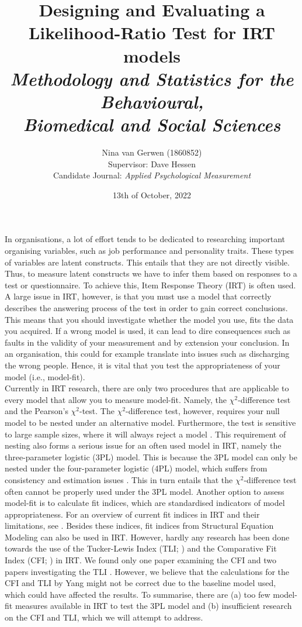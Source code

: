 \documentclass{article}
\title{%
	Designing and Evaluating a Likelihood-Ratio Test for IRT models \\
	\large \textit{Methodology and Statistics for the Behavioural, \\
	Biomedical and Social Sciences}}
\author{Nina van Gerwen (1860852) \\ 
	Supervisor: Dave Hessen \\ 
	\small {Candidate Journal: \textit{Applied Psychological Measurement}}}
\date{13th of October, 2022}
\begin{document}
\maketitle

\newpage

\section{}
\indent In organisations, a lot of effort tends to be dedicated to researching important organising variables, such as job performance and personality traits. These types of variables are latent constructs. This entails that they are not directly visible. Thus, to measure latent constructs we have to infer them based on responses to a test or questionnaire. To achieve this, Item Response Theory (IRT) is often used. A large issue in IRT, however, is that you must use a model that correctly describes the answering process of the test in order to gain correct conclusions. This means that you should investigate whether the model you use, fits the data you acquired. If a wrong model is used, it can lead to dire consequences such as faults in the validity of your measurement \autocite{consq1, consq2, consq3} and by extension your conclusion. In an organisation, this could for example translate into issues such as discharging the wrong people. Hence, it is vital that you test the appropriateness of your model (i.e., model-fit). \\
\indent Currently in IRT research, there are only two procedures that are applicable to every model that allow you to measure model-fit. Namely, the $\chi^2$-difference test and the Pearson's $\chi^2$-test. The $\chi^2$-difference test, however, requires your null model to be nested under an alternative model. Furthermore, the test is sensitive to large sample sizes, where it will always reject a model \autocite{chi2sens}. This requirement of nesting also forms a serious issue for an often used model in IRT, namely the three-parameter logistic (3PL) model. This is because the 3PL model can only be nested under the four-parameter logistic (4PL) model, which suffers from consistency and estimation issues \autocite{4plconsist1, 4plconsist2}. This in turn entails that the $\chi^2$-difference test often cannot be properly used under the 3PL model. Another option to assess model-fit is to calculate fit indices, which are standardised indicators of model appropriateness. For an overview of current fit indices in IRT and their limitations, see \textcite{ref1}. Besides these indices, fit indices from Structural Equation Modeling can also be used in IRT. However, hardly any research has been done towards the use of the Tucker-Lewis Index (TLI; \cite{tli}) and the Comparative Fit Index (CFI; \cite{cfi}) in IRT. We found only one paper examining the CFI \autocite{yangfitindex} and two papers investigating the TLI \autocite{yangfitindex, tliirt}. However, we believe that the calculations for the CFI and TLI by Yang might not be correct due to the baseline model used, which could have affected the results. To summarise, there are (a) too few model-fit measures available in IRT to test the 3PL model and (b) insufficient research on the CFI and TLI, which we will attempt to address. \\
\end{document}
